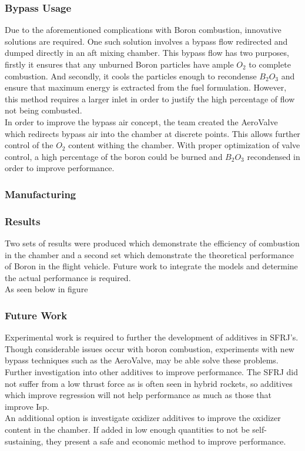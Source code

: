 \subsubsection{Bypass Usage}
Due to the aforementioned complications with Boron combustion, innovative solutions are required. One such solution involves a bypass flow redirected and dumped directly in an aft mixing chamber. This bypass flow has two purposes, firstly it ensures that any unburned Boron particles have ample $O_2$ to complete combustion. And secondly, it cools the particles enough to recondense $B_2O_3$ and ensure that maximum energy is extracted from the fuel formulation. However, this method requires a larger inlet in order to justify the high percentage of flow not being combusted. \\ \indent
In order to improve the bypass air concept, the team created the AeroValve which redirects bypass air into the chamber at discrete points. This allows further control of the $O_2$ content withing the chamber. With proper optimization of valve control, a high percentage of the boron could be burned and $B_2O_3$ recondensed in order to improve performance. \\ \indent
\subsubsection{Manufacturing}
\subsubsection{Results}
Two sets of results were produced which demonstrate the efficiency of combustion in the chamber and a second set which demonstrate the theoretical performance of Boron in the flight vehicle. Future work to integrate the models and determine the actual performance is required. \\ \indent
As seen below in figure
\subsubsection{Future Work}
Experimental work is required to further the development of additives in SFRJ's. Though considerable issues occur with boron combustion, experiments with new bypass techniques such as the AeroValve, may be able solve these problems. \\ \indent
Further investigation into other additives to improve performance. The SFRJ did not suffer from a low thrust force as is often seen in hybrid rockets, so additives which improve regression will not help performance as much as those that improve Isp. \\ \indent
An additional option is investigate oxidizer additives to improve the oxidizer content in the chamber. If added in low enough quantities to not be self-sustaining, they present a safe and economic method to improve performance.